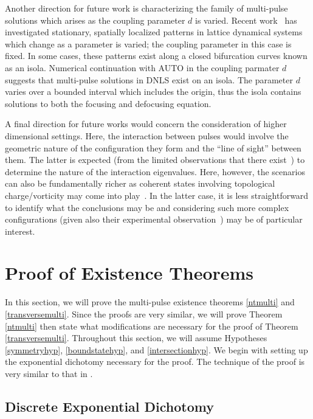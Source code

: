 \documentclass[12pt]{elsarticle}
\begin{document}
Another direction for future work is characterizing the family of multi-pulse solutions which arises as the coupling parameter $d$ is varied. Recent work~\cite{Jason2019} has investigated stationary, spatially localized patterns in lattice dynamical systems which change as a parameter is varied; the coupling parameter in this case is fixed. In some cases, these patterns exist along a closed bifurcation curves known as an isola. Numerical continuation with AUTO in the coupling parmater $d$ suggests that multi-pulse solutions in DNLS exist on an isola. The parameter $d$ varies over a bounded interval which includes the origin, thus the isola contains solutions to both the focusing and defocusing equation.

A final direction for future works
would concern the consideration of higher dimensional
settings. Here, the interaction between pulses 
would involve the geometric nature of the configuration
they form and the ``line of sight'' between them.
The latter is expected (from the limited observations that
there exist~\cite{alanold}) to determine the nature
of the interaction eigenvalues. Here, however, the
scenarios can also be fundamentally richer as 
coherent states involving topological charge/vorticity
may come into play~\cite{Kevrekidis2009}. In the latter
case, it is less straightforward to identify what the
conclusions may be and considering such more complex
configurations (given also their experimental
observation~\cite{vo3a,vo3b}) may be of particular 
interest.

\section{Proof of Existence Theorems}

In this section, we will prove the multi-pulse existence theorems \ref{ntmulti} and \ref{transversemulti}. Since the proofs are very similar, we will prove Theorem \ref{ntmulti} then state what modifications are necessary for the proof of Theorem \ref{transversemulti}. Throughout this section, we will assume Hypotheses \ref{symmetryhyp}, \ref{boundstatehyp}, and \ref{intersectionhyp}. We begin with setting up the exponential dichotomy necessary for the proof. The technique of the proof is very similar to that in \cite{Sandstede1997}.

\subsection{Discrete Exponential Dichotomy}
\end{document}
